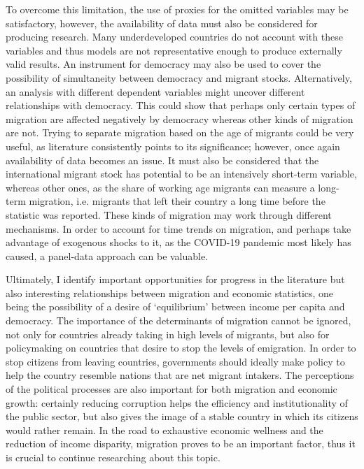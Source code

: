 \documentclass[../main.tex]{subfiles}
\begin{document}
To overcome this limitation, the use of proxies for the omitted variables may be satisfactory, however, the availability of data must also be considered for producing research. Many underdeveloped countries do not account with these variables and thus models are not representative enough to produce externally valid results. An instrument for democracy may also be used to cover the possibility of simultaneity between democracy and migrant stocks. Alternatively, an analysis with different dependent variables might uncover different relationships with democracy. This could show that perhaps only certain types of migration are affected negatively by democracy whereas other kinds of migration are not. Trying to separate migration based on the age of migrants could be very useful, as literature consistently points to its significance; however, once again availability of data becomes an issue. It must also be considered that the international migrant stock has potential to be an intensively short-term variable, whereas other ones, as the share of working age migrants can measure a long-term migration, i.e. migrants that left their country a long time before the statistic was reported. These kinds of migration may work through different mechanisms. In order to account for time trends on migration, and perhaps take advantage of exogenous shocks to it, as the COVID-19 pandemic most likely has caused, a panel-data approach can be valuable.

Ultimately, I identify important opportunities for progress in the literature but also interesting relationships between migration and economic statistics, one being the possibility of a desire of  ‘equilibrium’ between income per capita and democracy. The importance of the determinants of migration cannot be ignored, not only for countries already taking in high levels of migrants, but also for policymaking on countries that desire to stop the levels of emigration.  In order to stop citizens from leaving countries, governments should ideally make policy to help the country resemble nations that are net migrant intakers. The perceptions of the political processes are also important for both migration and economic growth: certainly reducing corruption helps the efficiency and institutionality of the public sector, but also gives the image of a stable country in which its citizens would rather remain. In the road to exhaustive economic wellness and the reduction of income disparity, migration proves to be an important factor, thus it is crucial to continue researching about this topic.
\end{document}
